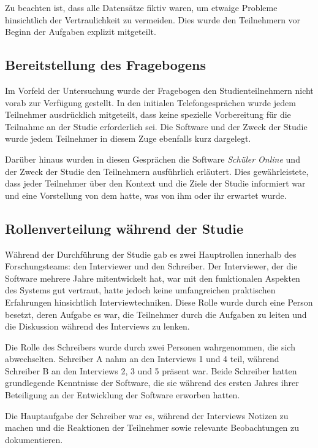 Zu beachten ist, dass alle Datensätze fiktiv waren, um etwaige Probleme hinsichtlich der Vertraulichkeit zu vermeiden. Dies wurde den Teilnehmern vor Beginn der Aufgaben explizit mitgeteilt.

\subsection{Bereitstellung des Fragebogens}

Im Vorfeld der Untersuchung wurde der Fragebogen den Studienteilnehmern nicht vorab zur Verfügung gestellt. In den initialen Telefongesprächen wurde jedem Teilnehmer ausdrücklich mitgeteilt, dass keine spezielle Vorbereitung für die Teilnahme an der Studie erforderlich sei. Die Software und der Zweck der Studie wurde jedem Teilnehmer in diesem Zuge ebenfalls kurz dargelegt.

Darüber hinaus wurden in diesen Gesprächen die Software \textit{Schüler Online} und der Zweck der Studie den Teilnehmern ausführlich erläutert. Dies gewährleistete, dass jeder Teilnehmer über den Kontext und die Ziele der Studie informiert war und eine Vorstellung von dem hatte, was von ihm oder ihr erwartet wurde.

\subsection{Rollenverteilung während der Studie}

Während der Durchführung der Studie gab es zwei Hauptrollen innerhalb des Forschungsteams: den Interviewer und den Schreiber. Der Interviewer, der die Software mehrere Jahre mitentwickelt hat, war mit den funktionalen Aspekten des Systems gut vertraut, hatte jedoch keine umfangreichen praktischen Erfahrungen hinsichtlich Interviewtechniken. Diese Rolle wurde durch eine Person besetzt, deren Aufgabe es war, die Teilnehmer durch die Aufgaben zu leiten und die Diskussion während des Interviews zu lenken.

Die Rolle des Schreibers wurde durch zwei Personen wahrgenommen, die sich abwechselten. Schreiber A nahm an den Interviews 1 und 4 teil, während Schreiber B an den Interviews 2, 3 und 5 präsent war. Beide Schreiber hatten grundlegende Kenntnisse der Software, die sie während des ersten Jahres ihrer Beteiligung an der Entwicklung der Software erworben hatten.

Die Hauptaufgabe der Schreiber war es, während der Interviews Notizen zu machen und die Reaktionen der Teilnehmer sowie relevante Beobachtungen zu dokumentieren. 

